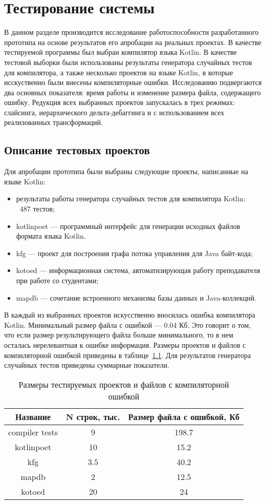\chapter{Тестирование системы}

В данном разделе производится исследование работоспособности разработанного прототипа на основе результатов его апробации на реальных проектах. В качестве тестируемой программы был выбран компилятор языка Kotlin. В качестве тестовой выборки были использованы результаты генератора случайных тестов для компилятора, а также несколько проектов на языке Kotlin, в которые исскуственно были внесены компиляторные ошибки. Исследованию подвергаются два основных показателя: время работы и изменение размера файла, содержащего ошибку. Редукция всех выбранных проектов запускалась в трех режимах: слайсинга, иерархического дельта-дебаггинга и с использованием всех реализованных трансформаций.
\section{Описание тестовых проектов}
Для апробации прототипа были выбраны следующие проекты, написанные на языке Kotlin:
\begin{itemize}
\item результаты работы генератора случайных тестов для компилятора Kotlin: ~487 тестов;
\item kotlinpoet --- программный интерфейс для генерации исходных файлов формата языка Kotlin. 
\item kfg --- проект для построения графа потока управления для Java байт-кода;
\item kotoed --- информационная система, автоматизирующая работу преподавателя при работе со студентами;
\item mapdb --- сочетание встроенного механизма базы данных и Java-коллекций.
\end{itemize}
В каждый из выбранных проектов искусственно вносилась ошибка компилятора Kotlin. Минимальный размер файла с ошибкой --- 0.04 Кб. Это говорит о том, что если размер результирующего файла больше минимального, то в нем осталась нерелевантная к ошибке информация. Размеры проектов и файлов с компиляторной ошибкой приведены в таблице~\ref{tab:size}. Для результатов генератора случайных тестов приведены суммарные показатели.
\begin{table}[]
\center
\caption{\label{tab:size}Размеры тестируемых проектов и файлов с компиляторной ошибкой}
\begin{tabular}{| c | c | c |}
\hline
\bf Название & \bf N строк, тыс. & \bf Размер файла с ошибкой, Кб \\
\hline
compiler tests & 9 & 198.7\\
\hline
kotlinpoet & 10 & 15.2\\
\hline
kfg & 3.5 & 40.2\\
\hline
mapdb & 2 & 12.5\\
\hline
kotoed & 20 & 24\\
\hline
\end{tabular}
\end{table}

